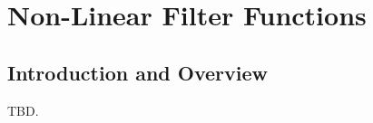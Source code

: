 \chapter{Non-Linear Filter Functions}
\label{cnfi0}


\section{Introduction and Overview}
\label{cnfi0:siov0}

TBD.

